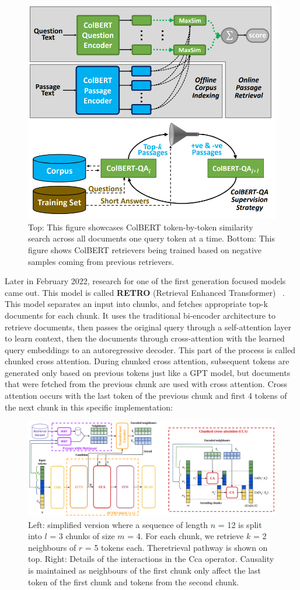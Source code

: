 \documentclass[twocolumn, 10pt]{article}
\begin{document}
\begin{figure}[H]
    \centering
    \includegraphics[width=0.5\linewidth]{ColBERT_OpenQA.png}
    \caption{Top: This figure showcases ColBERT token-by-token similarity search across all documents one query token at a time. Bottom: This figure shows ColBERT retrievers being trained based on negative samples coming from previous retrievers.}
    \label{fig:indexing-process}
\end{figure}

Later in February 2022, research for one of the first generation focused models came out. This model is called \textbf{RETRO} (Retrieval Enhanced Transformer) ~\cite{borgeaud2022improving}. This model separates an input into chunks, and fetches appropriate top-k documents for each chunk. It uses the traditional bi-encoder architecture to retrieve documents, then passes the original query through a self-attention layer to learn context, then the documents through cross-attention with the learned query embeddings to
an autoregressive decoder. This part of the process is called chunked cross attention. During chunked cross attention, subsequent tokens are generated only based on previous tokens just like a GPT model, but documents that were fetched from the previous chunk are used with cross attention. Cross attention occurs with the last token of the previous chunk and first 4 tokens of the next chunk in this specific implementation:

\begin{figure}[H]
    \centering
     \includegraphics[width=\linewidth]{RETRO_CCA.png}
    \caption{Left: simplified version where a sequence of length \(n\) = 12 is split into \(l\) = 3 chunks of size \(m\) = 4. For each chunk, we retrieve \(k\) = 2 neighbours of \(r\) = 5 tokens each. Theretrieval pathway is shown on top. Right: Details of the interactions in the Cca operator. Causality is maintained as neighbours of the first chunk only affect the last token of the first chunk and tokens from the second chunk.}
    \label{fig:indexing-process}
\end{figure}
\end{document}

